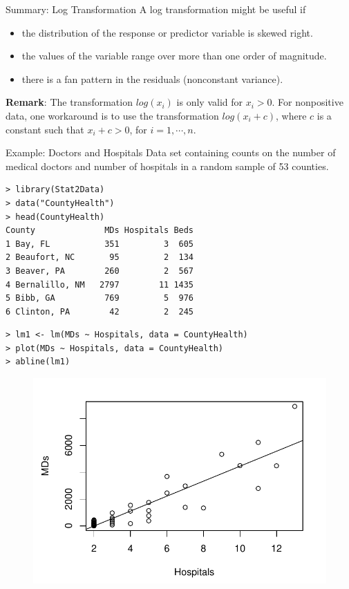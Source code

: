 \documentclass[10pt]{beamer}
\begin{document}
\begin{frame}{Summary: Log Transformation}
A log transformation might be useful if
\begin{itemize}
\item the distribution of the response or predictor variable is skewed right.
\item the values of the variable range over more than one order of magnitude.
\item there is a fan pattern in the residuals (nonconstant variance).
\end{itemize}
\vspace{15pt}

\textbf{Remark}: The transformation $log(x_i)$ is only valid for $x_i>0$.  For nonpositive data, one workaround is to use the transformation $log(x_i + c)$, where $c$ is a constant such that $x_i + c > 0$, for $i=1,\cdots,n$.  
\end{frame}

\begin{frame}[fragile]{Example: Doctors and Hospitals} 
Data set containing counts on the number of medical doctors and number of hospitals in a random sample of 53 counties. 
\begin{verbatim}
> library(Stat2Data)
> data("CountyHealth")
> head(CountyHealth)
County              MDs Hospitals Beds
1 Bay, FL           351         3  605
2 Beaufort, NC       95         2  134
3 Beaver, PA        260         2  567
4 Bernalillo, NM   2797        11 1435
5 Bibb, GA          769         5  976
6 Clinton, PA        42         2  245
\end{verbatim}
\end{frame}

\begin{frame}[fragile]
\begin{verbatim}
> lm1 <- lm(MDs ~ Hospitals, data = CountyHealth)
> plot(MDs ~ Hospitals, data = CountyHealth)
> abline(lm1)
\end{verbatim}
\begin{figure}
\includegraphics[scale=0.6]{figure/MDs_scatter1.pdf}
\end{figure}
\end{frame}
\end{document}
